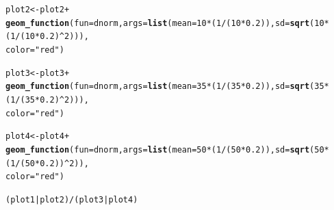 \documentclass{article}\usepackage[]{graphicx}\usepackage[]{color}
\makeatletter
\newcommand{\hlnum}[1]{\textcolor[rgb]{0.686,0.059,0.569}{#1}}%
\newcommand{\hlstr}[1]{\textcolor[rgb]{0.192,0.494,0.8}{#1}}%
\newcommand{\hlopt}[1]{\textcolor[rgb]{0,0,0}{#1}}%
\newcommand{\hlstd}[1]{\textcolor[rgb]{0.345,0.345,0.345}{#1}}%
\newcommand{\hlkwb}[1]{\textcolor[rgb]{0.69,0.353,0.396}{#1}}%
\newcommand{\hlkwc}[1]{\textcolor[rgb]{0.333,0.667,0.333}{#1}}%
\newcommand{\hlkwd}[1]{\textcolor[rgb]{0.737,0.353,0.396}{\textbf{#1}}}%
\newenvironment{kframe}{%
 \def\at@end@of@kframe{}%
 \ifinner\ifhmode%
  \def\at@end@of@kframe{\end{minipage}}%
  \begin{minipage}{\columnwidth}%
 \fi\fi%
 \def\FrameCommand##1{\hskip\@totalleftmargin \hskip-\fboxsep
 \colorbox{shadecolor}{##1}\hskip-\fboxsep
     \hskip-\linewidth \hskip-\@totalleftmargin \hskip\columnwidth}%
 \MakeFramed {\advance\hsize-\width
   \@totalleftmargin\z@ \linewidth\hsize
   \@setminipage}}%
 {\par\unskip\endMakeFramed%
 \at@end@of@kframe}
\newenvironment{knitrout}{}{} %
\makeatother
\begin{document}
\begin{enumerate}
\begin{enumerate}
\begin{knitrout}
\begin{kframe}
\begin{alltt}
\hlstd{plot2} \hlkwb{<-} \hlstd{plot2}\hlopt{+}
  \hlkwd{geom_function}\hlstd{(}\hlkwc{fun}\hlstd{=dnorm,} \hlkwc{args}\hlstd{=}\hlkwd{list}\hlstd{(}\hlkwc{mean}\hlstd{=}\hlnum{10}\hlopt{*}\hlstd{(}\hlnum{1}\hlopt{/}\hlstd{(}\hlnum{10}\hlopt{*}\hlnum{0.2}\hlstd{)),} \hlkwc{sd}\hlstd{=}\hlkwd{sqrt}\hlstd{(}\hlnum{10}\hlopt{*}\hlstd{(}\hlnum{1}\hlopt{/}\hlstd{(}\hlnum{10}\hlopt{*}\hlnum{0.2}\hlstd{)}\hlopt{^}\hlnum{2}\hlstd{))),}
                \hlkwc{color}\hlstd{=}\hlstr{"red"}\hlstd{)}

\hlstd{plot3} \hlkwb{<-} \hlstd{plot3}\hlopt{+}
  \hlkwd{geom_function}\hlstd{(}\hlkwc{fun}\hlstd{=dnorm,} \hlkwc{args}\hlstd{=}\hlkwd{list}\hlstd{(}\hlkwc{mean}\hlstd{=}\hlnum{35}\hlopt{*}\hlstd{(}\hlnum{1}\hlopt{/}\hlstd{(}\hlnum{35}\hlopt{*}\hlnum{0.2}\hlstd{)),} \hlkwc{sd}\hlstd{=}\hlkwd{sqrt}\hlstd{(}\hlnum{35}\hlopt{*}\hlstd{(}\hlnum{1}\hlopt{/}\hlstd{(}\hlnum{35}\hlopt{*}\hlnum{0.2}\hlstd{)}\hlopt{^}\hlnum{2}\hlstd{))),}
                \hlkwc{color}\hlstd{=}\hlstr{"red"}\hlstd{)}

\hlstd{plot4} \hlkwb{<-} \hlstd{plot4}\hlopt{+}
  \hlkwd{geom_function}\hlstd{(}\hlkwc{fun}\hlstd{=dnorm,} \hlkwc{args}\hlstd{=}\hlkwd{list}\hlstd{(}\hlkwc{mean}\hlstd{=}\hlnum{50}\hlopt{*}\hlstd{(}\hlnum{1}\hlopt{/}\hlstd{(}\hlnum{50}\hlopt{*}\hlnum{0.2}\hlstd{)),} \hlkwc{sd}\hlstd{=}\hlkwd{sqrt}\hlstd{(}\hlnum{50}\hlopt{*}\hlstd{(}\hlnum{1}\hlopt{/}\hlstd{(}\hlnum{50}\hlopt{*}\hlnum{0.2}\hlstd{))}\hlopt{^}\hlnum{2}\hlstd{)),}
                \hlkwc{color}\hlstd{=}\hlstr{"red"}\hlstd{)}

\hlstd{(plot1}\hlopt{|}\hlstd{plot2)}\hlopt{/}\hlstd{(plot3}\hlopt{|}\hlstd{plot4)}
\end{alltt}


{\ttfamily\noindent\color{warningcolor}{\#\# Warning: Removed 700 row(s) containing missing values (geom\_path).}}

{\ttfamily\noindent\color{warningcolor}{\#\# Warning: Removed 700 row(s) containing missing values (geom\_path).}}

{\ttfamily\noindent\color{warningcolor}{\#\# Warning: Removed 700 row(s) containing missing values (geom\_path).}}


\end{kframe}
\end{knitrout}
\end{enumerate}
\end{enumerate}
\end{document}
